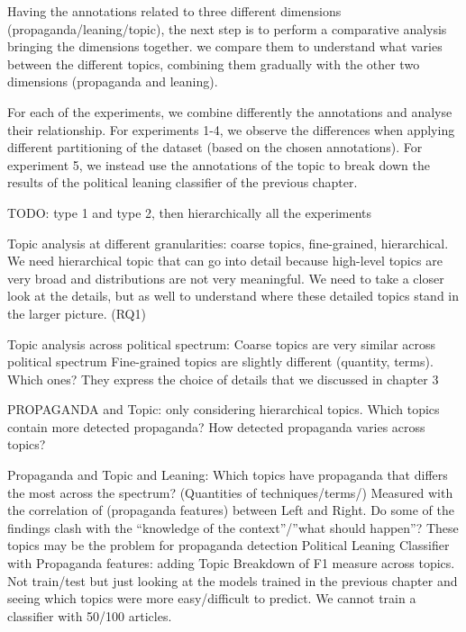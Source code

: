Having the annotations related to three different dimensions (propaganda/leaning/topic), the next step is to perform a comparative analysis bringing the dimensions together.
we compare them to understand what varies between the different topics, combining them gradually with the other two dimensions (propaganda and leaning).




For each of the experiments, we combine differently the annotations and analyse their relationship. For experiments 1-4, we observe the differences when applying different partitioning of the dataset (based on the chosen annotations). For experiment 5, we instead use the annotations of the topic to break down the results of the political leaning classifier of the previous chapter.

TODO: type 1 and type 2, then hierarchically all the experiments

Topic analysis at different granularities:
coarse topics, fine-grained, hierarchical. We need hierarchical topic that can go into detail because high-level topics are very broad and distributions are not very meaningful. We need to take a closer look at the details, but as well to understand where these detailed topics stand in the larger picture. (RQ1)

Topic analysis across political spectrum:
Coarse topics are very similar across political spectrum
Fine-grained topics are slightly different (quantity, terms). Which ones? They express the choice of details that we discussed in chapter 3

PROPAGANDA and Topic: only considering hierarchical topics.
Which topics contain more detected propaganda?
How detected propaganda varies across topics? 

Propaganda and Topic and Leaning:
Which topics have propaganda that differs the most across the spectrum? (Quantities of techniques/terms/) Measured with the correlation of (propaganda features) between Left and Right.
Do some of the findings clash with the “knowledge of the context”/”what should happen”? These topics may be the problem for propaganda detection
Political Leaning Classifier with Propaganda features: adding Topic
Breakdown of F1 measure across topics. Not train/test but just looking at the models trained in the previous chapter and seeing which topics were more easy/difficult to predict. We cannot train a classifier with 50/100 articles.



